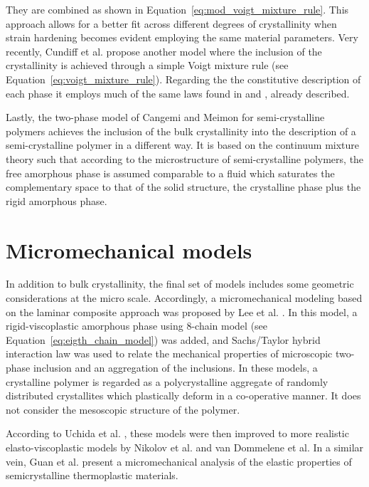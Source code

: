 They are combined as shown in Equation~\eqref{eq:mod_voigt_mixture_rule}.
This approach allows for a better fit across different degrees of crystallinity when strain hardening becomes evident employing the same material parameters.
Very recently, Cundiff et al. \citep{cundiffModelingViscoplasticBehavior2022} propose another model where the inclusion of the crystallinity is achieved through a simple Voigt mixture rule (see Equation~\eqref{eq:voigt_mixture_rule}).
Regarding the the constitutive description of each phase it employs much of the same laws found in \cite{ahziModelingDeformationBehavior2003} and \cite{chowdhuryEffectsManufacturingInducedVoids2008}, already described.

Lastly, the two-phase model of Cangemi and Meimon for semi-crystalline polymers \citep{cangemiTwoPhaseModelMechanical2001} achieves the inclusion of the bulk crystallinity into the description of a semi-crystalline polymer in a different way.
It is based on the continuum mixture theory such that according to the microstructure of semi-crystalline polymers, the free amorphous phase is assumed comparable to a fluid which saturates the complementary space to that of the solid structure, the crystalline phase plus the rigid amorphous phase.

\section{Micromechanical models}

In addition to bulk crystallinity, the final set of models includes some geometric considerations at the micro scale.
Accordingly, a micromechanical modeling based on the laminar composite approach was proposed by Lee et al. \citep{leeMicromechanicalModelingLarge1993, leeSimulationLargeStrain1993}.
In this model, a rigid-viscoplastic amorphous phase using 8-chain model (see Equation~\eqref{eq:eigth_chain_model}) was added, and Sachs/Taylor hybrid interaction law was used to relate the mechanical properties of microscopic two-phase inclusion and an aggregation of the inclusions.
In these models, a crystalline polymer is regarded as a polycrystalline aggregate of randomly distributed crystallites which plastically deform in a co-operative manner.
It does not consider the mesoscopic structure of the polymer.

According to Uchida et al. \citep{uchidaMicroMesoMacroscopic2013}, these models were then improved to more realistic elasto-viscoplastic models by Nikolov et al. \citep{nikolovMicroMacroConstitutive2000, nikolovMultiscaleConstitutiveModeling2002} and van Dommelene et al. \citep{vandommelenMicromechanicalModelingElastoviscoplastic2003}
In a similar vein, Guan et al. \citep{guanMicromechanicalModelElastic2004} present a micromechanical analysis of the elastic properties of semicrystalline thermoplastic materials.

